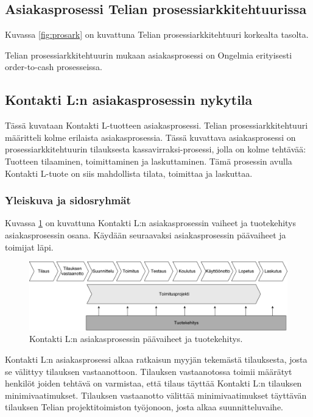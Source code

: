 \documentclass[finnish,12pt,a4paper,pdftex]{article}
\begin{document}
\subsection{Asiakasprosessi Telian prosessiarkkitehtuurissa}

Kuvassa \ref{fig:prosark} on kuvattuna Telian prosessiarkkitehtuuri korkealta tasolta. 


Telian prosessiarkkitehtuurin mukaan asiakasprosessi on 
Ongelmia erityisesti order-to-cash prosesseissa.


\subsection{Kontakti L:n asiakasprosessin nykytila}

Tässä kuvataan Kontakti L-tuotteen asiakasprosessi. Telian prosessiarkkitehtuuri määritteli kolme erilaista asiakasprosessia. Tässä kuvattava asiakasprosessi on prosessiarkkitehtuurin tilauksesta kassavirraksi-prosessi, jolla on kolme tehtävää: Tuotteen tilaaminen, toimittaminen ja laskuttaminen. Tämä prosessin avulla Kontakti L-tuote on siis mahdollista tilata, toimittaa ja laskuttaa.

\subsubsection{Yleiskuva ja sidosryhmät}

Kuvassa \ref{fig:paavaih} on kuvattuna Kontakti L:n asiakasprosessin vaiheet ja tuotekehitys asiakasprosessin osana. Käydään seuraavaksi asiakasprosessin päävaiheet ja toimijat läpi.

\begin{figure}[!h]
    \centering
    \includegraphics[scale=0.4]{images/ODI-prosessi.pdf}
    \caption{Kontakti L:n asiakasprosessin päävaiheet ja tuotekehitys.}
    \label{fig:paavaih}
\end{figure}

Kontakti L:n asiakasprosessi alkaa ratkaisun myyjän tekemästä tilauksesta, josta se välittyy tilauksen vastaanottoon. Tilauksen vastaanotossa toimii määrätyt henkilöt joiden tehtävä on varmistaa, että tilaus täyttää Kontakti L:n tilauksen minimivaatimukset. Tilauksen vastaanotto välittää minimivaatimukset täyttävän tilauksen Telian projektitoimiston työjonoon, josta alkaa suunnitteluvaihe.\\
\end{document}

